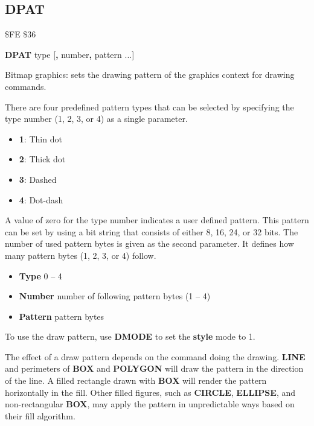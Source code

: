 \subsection{DPAT}
\begin{description}[leftmargin=2cm,style=nextline]
\item [Token:]    \$FE \$36

\item [Format:]   {\bf DPAT} type [{\bf,} number{\bf,} pattern ...]

\item [Usage:]    Bitmap graphics: sets the drawing pattern of the graphics context for drawing commands.

                  There are four predefined pattern types that can be selected by specifying the type number (1, 2, 3, or 4) as a single parameter.

                  \begin{itemize}
                     \item {\bf 1}: Thin dot
                     \item {\bf 2}: Thick dot
                     \item {\bf 3}: Dashed
                     \item {\bf 4}: Dot-dash
                  \end{itemize}

                  A value of zero for the type number indicates a user defined pattern. This pattern can be set by using a bit string that consists of either 8, 16, 24, or 32 bits. The number of used pattern bytes is given as the second parameter. It defines how many pattern bytes (1, 2, 3, or 4) follow.

                  \begin{itemize}
                     \item {\bf Type}    0 -- 4
                     \item {\bf Number}  number of following pattern bytes (1 -- 4)
                     \item {\bf Pattern} pattern bytes
                  \end{itemize}

\item[Remarks:]   To use the draw pattern, use {\bf DMODE} to set the {\bf style} mode to 1.

                  The effect of a draw pattern depends on the command doing the drawing. {\bf LINE} and perimeters of {\bf BOX} and {\bf POLYGON} will draw the pattern in the direction of the line. A filled rectangle drawn with {\bf BOX} will render the pattern horizontally in the fill. Other filled figures, such as {\bf CIRCLE}, {\bf ELLIPSE}, and non-rectangular {\bf BOX}, may apply the pattern in unpredictable ways based on their fill algorithm.


\end{description}
